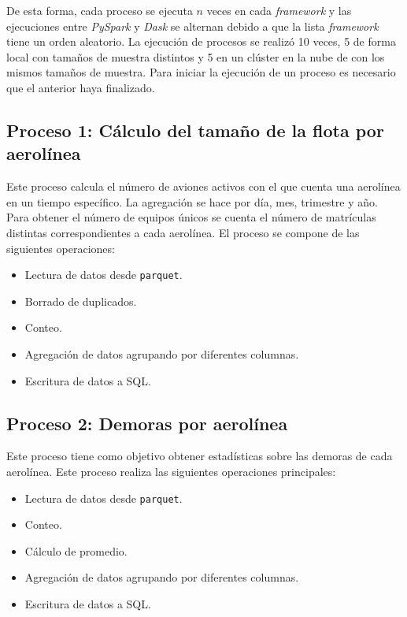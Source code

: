 De esta forma, cada proceso se ejecuta $n$ veces en cada \textit{framework} y las ejecuciones entre \textit{PySpark} y \textit{Dask} se alternan debido a que la lista \textit{framework} tiene un orden aleatorio. La ejecución de procesos se realizó 10 veces, 5 de forma local con tamaños de muestra distintos y 5 en un clúster en la nube de con los mismos tamaños de muestra. Para iniciar la ejecución de un proceso es necesario que el anterior haya finalizado.

\subsection{Proceso 1: Cálculo del tamaño de la flota por aerolínea}

Este proceso calcula el número de aviones activos con el que cuenta una aerolínea en un tiempo específico. La agregación se hace por día, mes, trimestre y año. Para obtener el número de equipos únicos se cuenta el número de matrículas distintas correspondientes a cada aerolínea. El proceso se compone de las siguientes operaciones:

\begin{itemize}
	\item Lectura de datos desde \texttt{parquet}.
	\item Borrado de duplicados.
	\item Conteo.
	\item Agregación de datos agrupando por diferentes columnas.
	\item Escritura de datos a SQL.
\end{itemize}

\subsection{Proceso 2: Demoras por aerolínea}

Este proceso tiene como objetivo obtener estadísticas sobre las demoras de cada aerolínea. Este proceso realiza las siguientes operaciones principales:

\begin{itemize}
	\item Lectura de datos desde \texttt{parquet}.
	\item Conteo.
	\item Cálculo de promedio.
	\item Agregación de datos agrupando por diferentes columnas.
	\item Escritura de datos a SQL.
\end{itemize}

